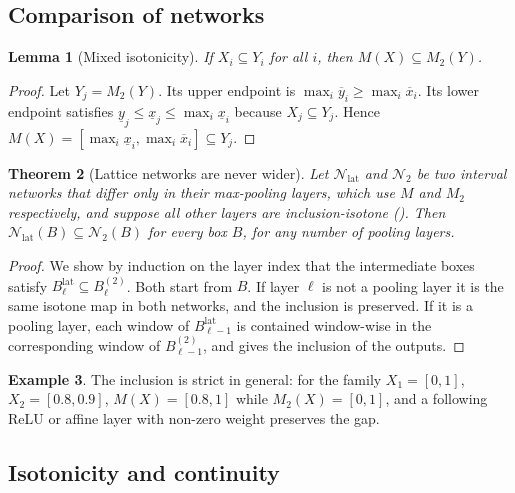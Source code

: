 \documentclass[preprint,12pt]{elsarticle}
\newtheorem{theorem}{Theorem}[section]
\newtheorem{lemma}[theorem]{Lemma}
\theoremstyle{definition}
\newtheorem{example}[theorem]{Example}
\newcommand{\lo}[1]{\underline{#1}}
\newcommand{\up}[1]{\overline{#1}}
\begin{document}
\subsection{Comparison of networks}

\begin{lemma}[Mixed isotonicity]\label{lem:mixed}
If $X_i\subseteq Y_i$ for all $i$, then $M(X)\subseteq M_2(Y)$.
\end{lemma}

\begin{proof}
Let $Y_j=M_2(Y)$. Its upper endpoint is $\max_i\up y_i\ge\max_i\up x_i$. Its lower endpoint satisfies $\lo y_j\le\lo x_j\le\max_i\lo x_i$ because $X_j\subseteq Y_j$. Hence $M(X)=[\max_i\lo x_i,\max_i\up x_i]\subseteq Y_j$.
\end{proof}

\begin{theorem}[Lattice networks are never wider]\label{thm:compare}
Let $\mathcal N_{\mathrm{lat}}$ and $\mathcal N_2$ be two interval networks that differ only in their max-pooling layers, which use $M$ and $M_2$ respectively, and suppose all other layers are inclusion-isotone (). Then $\mathcal N_{\mathrm{lat}}(B)\subseteq\mathcal N_2(B)$ for every box $B$, for any number of pooling layers.
\end{theorem}

\begin{proof}
We show by induction on the layer index that the intermediate boxes satisfy $B^{\mathrm{lat}}_\ell\subseteq B^{(2)}_\ell$. Both start from $B$. If layer $\ell$ is not a pooling layer it is the same isotone map in both networks, and the inclusion is preserved. If it is a pooling layer, each window of $B^{\mathrm{lat}}_{\ell-1}$ is contained window-wise in the corresponding window of $B^{(2)}_{\ell-1}$, and  gives the inclusion of the outputs.
\end{proof}

\begin{example}\label{ex:strict}
The inclusion is strict in general: for the family $X_1=[0,1]$, $X_2=[0.8,0.9]$, $M(X)=[0.8,1]$ while $M_2(X)=[0,1]$, and a following ReLU or affine layer with non-zero weight preserves the gap.
\end{example}

\subsection{Isotonicity and continuity}
\end{document}
